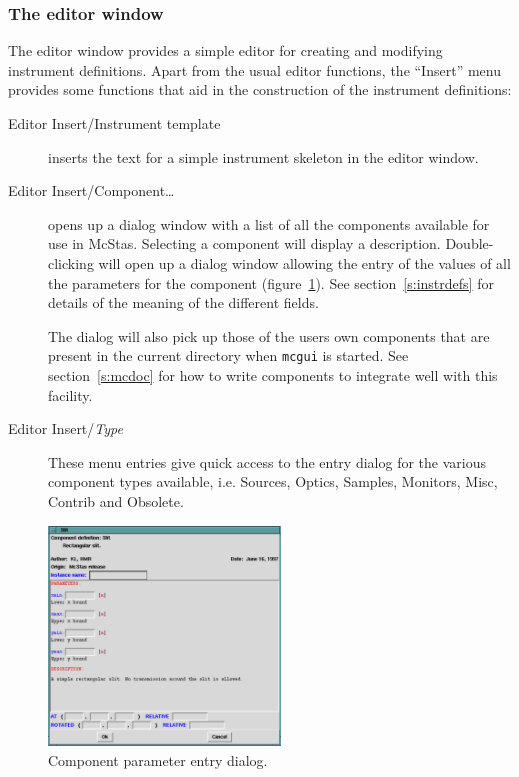 \subsubsection{The editor window}

The editor window provides a simple editor for creating and modifying instrument
definitions. Apart from the usual editor functions, the ``Insert'' menu provides
some functions that aid in the construction of the instrument definitions:
\begin{description}
\item[Editor Insert/Instrument template] inserts the text for a simple instrument
  skeleton in the editor window.
\item[Editor Insert/Component\ldots] opens up a dialog window with a list of all
  the components available for use in McStas. Selecting a component will
  display a description. Double-clicking will open up a dialog window
  allowing the entry of the values of all the parameters for the
  component (figure~\ref{f:comp_dialog}). See section~\ref{s:instrdefs}
  for details of the meaning of the different fields.

  The dialog will also pick up those of the users own components that are
  present in the current directory when \verb+mcgui+ is started. See
  section~\ref{s:mcdoc} for how to write components to integrate well with this
  facility.
\item[Editor Insert/\textit{Type}] These menu entries give quick access to the
  entry dialog for the various component types available, i.e. Sources, Optics,
  Samples, Monitors, Misc, Contrib and Obsolete.
\end{description}
\begin{figure}[tbp]
  \begin{center}
    \includegraphics[width=0.55\textwidth]{figures/comp_dialog}
    \caption{Component parameter entry dialog.}
    \label{f:comp_dialog}
  \end{center}
\end{figure}


